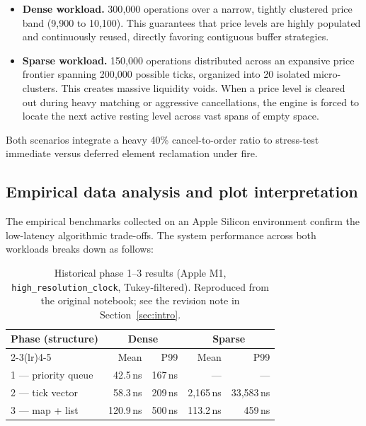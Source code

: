 \documentclass[11pt,a4paper]{article}
\begin{document}
\begin{itemize}
\item \textbf{Dense workload.} 300{,}000 operations over a narrow, tightly
      clustered price band (9{,}900 to 10{,}100). This guarantees that price
      levels are highly populated and continuously reused, directly
      favoring contiguous buffer strategies.
\item \textbf{Sparse workload.} 150{,}000 operations distributed across an
      expansive price frontier spanning 200{,}000 possible ticks, organized
      into 20 isolated micro-clusters. This creates massive liquidity
      voids. When a price level is cleared out during heavy matching or
      aggressive cancellations, the engine is forced to locate the next
      active resting level across vast spans of empty space.
\end{itemize}

Both scenarios integrate a heavy 40\% cancel-to-order ratio to stress-test
immediate versus deferred element reclamation under fire.

\subsection{Empirical data analysis and plot interpretation}

The empirical benchmarks collected on an Apple Silicon environment confirm
the low-latency algorithmic trade-offs. The system performance across both
workloads breaks down as follows:

\begin{table}[h]
\centering
\begin{tabular}{lrrrr}
\toprule
Phase (structure) & \multicolumn{2}{c}{Dense} & \multicolumn{2}{c}{Sparse} \\
\cmidrule(lr){2-3}\cmidrule(lr){4-5}
 & Mean & P99 & Mean & P99 \\
\midrule
1 --- priority queue   & 42.5\,ns  & 167\,ns & ---        & ---      \\
2 --- tick vector      & 58.3\,ns  & 209\,ns & 2{,}165\,ns & 33{,}583\,ns \\
3 --- map + list       & 120.9\,ns & 500\,ns & 113.2\,ns  & 459\,ns  \\
\bottomrule
\end{tabular}
\caption{Historical phase 1--3 results (Apple M1,
\texttt{high\_resolution\_clock}, Tukey-filtered). Reproduced from the
original notebook; see the revision note in Section~\ref{sec:intro}.}
\label{tab:phase123}
\end{table}
\end{document}

